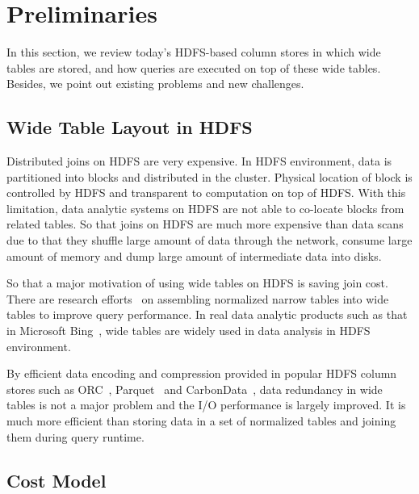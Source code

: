 \section{Preliminaries}

In this section, we review today's HDFS-based column stores in which wide tables are stored, and how queries are executed on top of these wide tables. Besides, we point out existing problems and new  challenges.

\subsection{Wide Table Layout in HDFS}

Distributed joins on HDFS are very expensive.
In HDFS environment, data is partitioned into blocks and distributed in the cluster. 
Physical location of block is controlled by HDFS and transparent to computation on top of HDFS.
With this limitation, data analytic systems on HDFS are not able to co-locate blocks from related tables.
So that joins on HDFS are much more expensive than data scans due to that they shuffle large amount of data through the network, consume large amount of memory and dump large amount of intermediate data into disks.

So that a major motivation of using wide tables on HDFS is saving join cost.
There are research efforts~\cite{WideTable:paper} on assembling normalized narrow tables into wide tables to improve query performance.
In real data analytic products such as that in Microsoft Bing~\cite{ColumnOrdering}, wide tables are widely used in data analysis in HDFS environment.

By efficient data encoding and compression provided in popular HDFS column stores such as ORC~\cite{ORCMainPage}, Parquet~\cite{parquetMainPage} and CarbonData~\cite{CarbonDataMainPage}, data redundancy in wide tables is not a major problem and the I/O performance is largely improved.
It is much more efficient than storing data in a set of normalized tables and joining them during query runtime.


\subsection{Cost Model}

